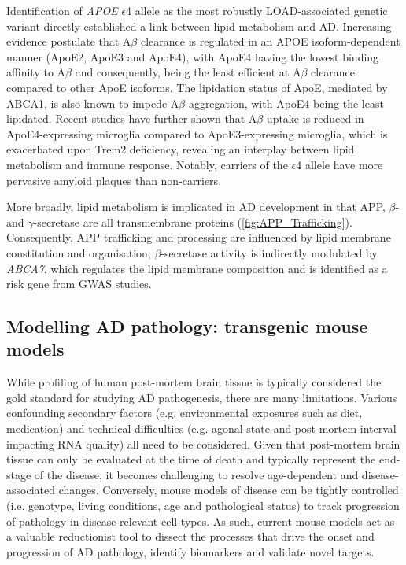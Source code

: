 \label{intro_lipid}
Identification of \textit{APOE} $\epsilon$4 allele as the most robustly LOAD-associated genetic variant directly established a link between lipid metabolism and AD. Increasing evidence postulate that A$\beta$ clearance is regulated in an APOE isoform-dependent manner (ApoE2, ApoE3 and ApoE4)\cite{Castellano2011}, with ApoE4 having the lowest binding affinity to A$\beta$ and consequently, being the least efficient at A$\beta$ clearance compared to other ApoE isoforms\cite{RM2012}. The lipidation status of ApoE, mediated by ABCA1\cite{R2010}, is also known to impede A$\beta$ aggregation, with ApoE4 being the least lipidated\cite{DM2006}. Recent studies have further shown that A$\beta$ uptake is reduced in ApoE4-expressing microglia compared to ApoE3-expressing microglia, which is exacerbated upon Trem2 deficiency, revealing an interplay between lipid metabolism and immune response\cite{Fitz2021}. Notably, carriers of the $\epsilon$4 allele have more pervasive amyloid plaques than non-carriers\cite{DE1993,E2009}.

More broadly, lipid metabolism is implicated in AD development in that APP, $\beta$- and $\gamma$-secretase are all transmembrane proteins (\cref{fig:APP_Trafficking}). Consequently, APP trafficking and processing are influenced by lipid membrane constitution and organisation\cite{DiPaolo2011}; $\beta$-secretase activity is indirectly modulated by \textit{ABCA7}, which regulates the lipid membrane composition and is identified as a risk gene from GWAS studies\cite{Sierksma2020,Sakae2016}.  


\clearpage
\subsection{Modelling AD pathology: transgenic mouse models}
While profiling of human post-mortem brain tissue is typically considered the gold standard for studying AD pathogenesis, there are many limitations. Various confounding secondary factors (e.g. environmental exposures such as diet, medication) and technical difficulties (e.g. agonal state and post-mortem interval impacting RNA quality) all need to be considered. Given that post-mortem brain tissue can only be evaluated at the time of death and typically represent the end-stage of the disease, it becomes challenging to resolve age-dependent and disease-associated changes. Conversely, mouse models of disease can be tightly controlled (i.e. genotype, living conditions, age and pathological status) to track progression of pathology in disease-relevant cell-types. As such, current mouse models act as a valuable reductionist tool to dissect the processes that drive the onset and progression of AD pathology, identify biomarkers and validate novel targets\cite{Hall2012}.


